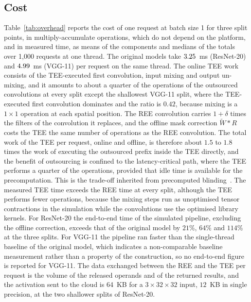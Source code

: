 \documentclass[lettersize,journal]{IEEEtran}
\begin{document}
\subsection{Cost}
Table~\ref{tab:overhead} reports the cost of one request at batch size 1 for three split points, in multiply-accumulate operations, which do not depend on the platform, and in measured time, as means of the components and medians of the totals over 1{,}000 requests at one thread. The original models take $3.25$~ms (ResNet-20) and $4.99$~ms (VGG-11) per request on the same thread. The online TEE work consists of the TEE-executed first convolution, input mixing and output un-mixing, and it amounts to about a quarter of the operations of the outsourced convolutions at every split except the shallowest VGG-11 split, where the TEE-executed first convolution dominates and the ratio is $0.42$, because mixing is a $1\times1$ operation at each spatial position. The REE convolution carries $1+\delta$ times the filters of the convolution it replaces, and the offline mask correction $\tilde W*R$ costs the TEE the same number of operations as the REE convolution. The total work of the TEE per request, online and offline, is therefore about $1.5$ to $1.8$ times the work of executing the outsourced prefix inside the TEE directly, and the benefit of outsourcing is confined to the latency-critical path, where the TEE performs a quarter of the operations, provided that idle time is available for the precomputation. This is the trade-off inherited from precomputed blinding~\cite{tramer2018slalom,sun2023shadownet}. The measured TEE time exceeds the REE time at every split, although the TEE performs fewer operations, because the mixing steps run as unoptimised tensor contractions in the simulation while the convolutions use the optimised library kernels. For ResNet-20 the end-to-end time of the simulated pipeline, excluding the offline correction, exceeds that of the original model by $21\%$, $64\%$ and $114\%$ at the three splits. For VGG-11 the pipeline ran faster than the single-thread baseline of the original model, which indicates a non-comparable baseline measurement rather than a property of the construction, so no end-to-end figure is reported for VGG-11. The data exchanged between the REE and the TEE per request is the volume of the released operands and of the returned results, and the activation sent to the cloud is 64~KB for a $3\times32\times32$ input, $12$~KB in single precision, at the two shallower splits of ResNet-20.

\begin{table}[!t]
\centering
\caption{Cost of one request}
\label{tab:overhead}

\end{table}
\end{document}
